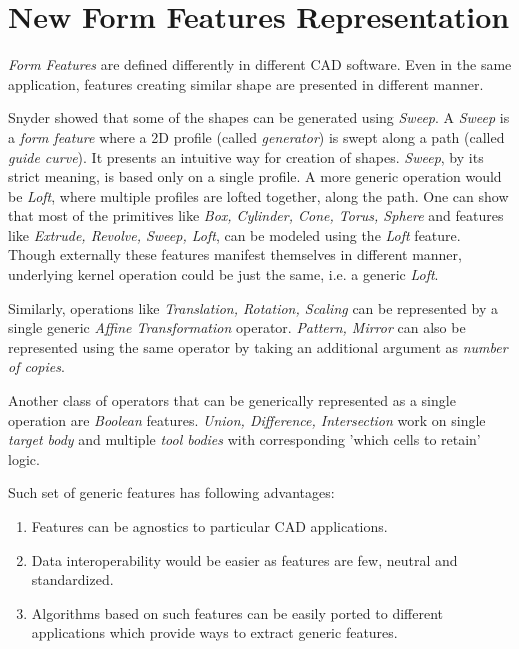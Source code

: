 \newcommand{\loft}[5]{\ensuremath{\textcolor{magenta}{\Omega{\bf \mathcal{L}}_{#1}^{#2,#3}}\textcolor{blue}{[\{#4\} (#5)]}}}
\newcommand{\affine}[5]{\ensuremath{\textcolor{cyan}{\Delta{\bf \mathcal{A}}_{#1}^{#2,#3}} \textcolor{blue}{[\{#4\} (#5)]}}}
\newcommand{\boolop}[5]{\ensuremath{\textcolor{green}{\Omega{\bf \mathcal{B}}_{#1}^{#2,#3}}\textcolor{blue}{[\{#4\} (#5)]}}}
\newcommand{\generic}[7]{\ensuremath{\textcolor{red}{#1{\bf \mathcal{#2}}_{#3}^{#4,#5}}\textcolor{blue}{[\{#6\} (#7)]}}}


\section{New Form Features Representation}

{\em Form Features} are defined differently in different CAD software. Even in the same application, features creating similar shape are presented in different manner.

Snyder \cite{Snyder1992} showed that some of the shapes can be generated using {\em Sweep}. A {\em Sweep} is a {\em form feature} where a 2D profile (called {\em generator}) is swept along a path (called {\em guide curve}). It presents an intuitive way for creation of shapes. {\em Sweep}, by its strict meaning, is based only on a single profile. A more generic operation would be {\em Loft}, where multiple profiles are lofted together, along the path. One can show that most of the primitives like {\em Box, Cylinder, Cone, Torus, Sphere} and features like {\em Extrude, Revolve, Sweep, Loft}, can be modeled using the {\em Loft} feature. Though externally these features manifest themselves in different manner, underlying kernel operation could be just the same, i.e. a generic {\em Loft}.

Similarly, operations like {\em Translation, Rotation, Scaling} can be represented by a single generic {\em Affine Transformation} operator. {\em Pattern, Mirror} can also be represented using the same operator by taking an additional argument as {\em number of copies}.

Another class of operators that can be generically represented as a single operation are {\em  Boolean} features. {\em Union, Difference, Intersection} work on single {\em target body} and multiple {\em tool bodies} with corresponding  'which cells to retain' logic.

Such set of generic features has following advantages:
\begin{enumerate}
\item Features can be agnostics to particular CAD applications. 
\item Data interoperability would be easier as features are few, neutral and standardized.
\item Algorithms based on such features can be easily ported to different applications which provide ways to extract generic features.
\end{enumerate}

